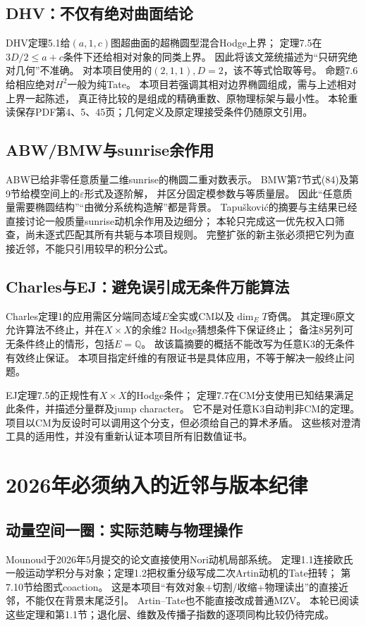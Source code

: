 \documentclass[11pt,a4paper]{ctexart}
\theoremstyle{cnplain}\newtheorem{proposition}{命题}[section]
\newcommand{\Q}{\mathbb Q}
\begin{document}
\normalsize

\subsection{DHV：不仅有绝对曲面结论}
DHV定理5.1给$(a,1,c)$图超曲面的超椭圆型混合Hodge上界；
定理7.5在$3D/2\le a+c$条件下还给相对对象的同类上界。
因此将该文笼统描述为“只研究绝对几何”不准确。
对本项目使用的$(2,1,1),D=2$，该不等式恰取等号。
命题7.6给相应绝对$H^2$一般为纯Tate。
本项目若强调其相对边界椭圆组成，需与上述相对上界一起陈述，
真正待比较的是组成的精确重数、原物理标架与最小性。
本轮重读保存PDF第4、5、45页；几何定义及原定理接受条件仍随原文引用。

\subsection{ABW/BMW与sunrise余作用}
ABW\cite{ABW}已给非零任意质量二维sunrise的椭圆二重对数表示。
BMW\cite{BMW}第7节式(84)及第9节给模空间上的$\varepsilon$形式及逐阶解，
并区分固定模参数与等质量层。
因此“任意质量需要椭圆结构”“由微分系统构造解”都是背景。
Tapušković\cite{Tap}的摘要与主结果已经直接讨论一般质量sunrise动机余作用及边细分；
本轮只完成这一优先权入口筛查，尚未逐式匹配其所有共轭与本项目规则。
完整扩张的新主张必须把它列为直接近邻，不能只引用较早的积分公式。

\subsection{Charles与EJ：避免误引成无条件万能算法}
Charles定理1的应用需区分端同态域$E$全实或CM以及$\dim_E T$奇偶。
其定理6原文允许算法不终止，并在$X\times X$的余维2 Hodge猜想条件下保证终止；
备注8另列可无条件终止的情形，包括$E=\Q$。
故该篇摘要的概括不能改写为任意K3的无条件有效终止保证。
本项目指定纤维的有限证书是具体应用，不等于解决一般终止问题。

EJ定理7.5的正规性有$X\times X$的Hodge条件；
定理7.7在CM分支使用已知结果满足此条件，并描述分量群及jump character。
它不是对任意K3自动判非CM的定理。
项目以CM为反设时可以调用这个分支，但必须给自己的算术矛盾。
这些核对澄清工具的适用性，并没有重新认证本项目所有旧数值证书。

\section{2026年必须纳入的近邻与版本纪律}
\subsection{动量空间一圈：实际范畴与物理操作}
Mounoud于2026年5月提交的论文\cite{Mou}直接使用Nori动机局部系统。
定理1.1连接欧氏一般运动学积分与对象；定理1.2把权重分级写成二次Artin动机的Tate扭转；
第7.10节给图式coaction。
这是本项目“有效对象+切割/收缩+物理读出”的直接近邻，不能仅在背景末尾泛引。
Artin--Tate也不能直接改成普通MZV。
本轮已阅读这些定理和第1.1节；退化层、维数及传播子指数的逐项同构比较仍待完成。
\end{document}
